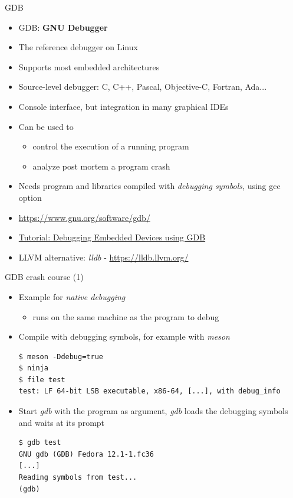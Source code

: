 \begin{frame}{GDB}
  \begin{itemize}
  \item GDB: {\bf GNU Debugger}
  \item The reference debugger on Linux
  \item Supports most embedded architectures
  \item Source-level debugger: C, C++, Pascal, Objective-C, Fortran,
    Ada...
  \item Console interface, but integration in many graphical IDEs
  \item Can be used to
    \begin{itemize}
    \item control the execution of a running program
    \item analyze post mortem a program crash
    \end{itemize}
  \item Needs program and libraries compiled with {\em debugging
      symbols}, using gcc  option
  \item \url{https://www.gnu.org/software/gdb/}
  \item \href{https://www.youtube.com/watch?v=JGhAgd2a_Ck}{Tutorial:
      Debugging Embedded Devices using GDB}
  \item LLVM alternative: {\em lldb} - \url{https://lldb.llvm.org/}
  \end{itemize}
\end{frame}

\begin{frame}[fragile]{GDB crash course (1)}
  \begin{itemize}
  \item Example for {\em native debugging}
    \begin{itemize}
    \item {} runs on the same machine as the program to debug
    \end{itemize}
  \item Compile with debugging symbols, for example with {\em meson}
    \begin{block}{}
      {\small
\begin{verbatim}
$ meson -Ddebug=true
$ ninja
$ file test
test: LF 64-bit LSB executable, x86-64, [...], with debug_info
\end{verbatim}
      }
    \end{block}
  \item Start {\em gdb} with the program as argument, {\em gdb} loads
    the debugging symbols and waits at its prompt
    \begin{block}{}
      {\small
\begin{verbatim}
$ gdb test
GNU gdb (GDB) Fedora 12.1-1.fc36
[...]
Reading symbols from test...
(gdb)
\end{verbatim}
      }
    \end{block}
  \end{itemize}
\end{frame}


